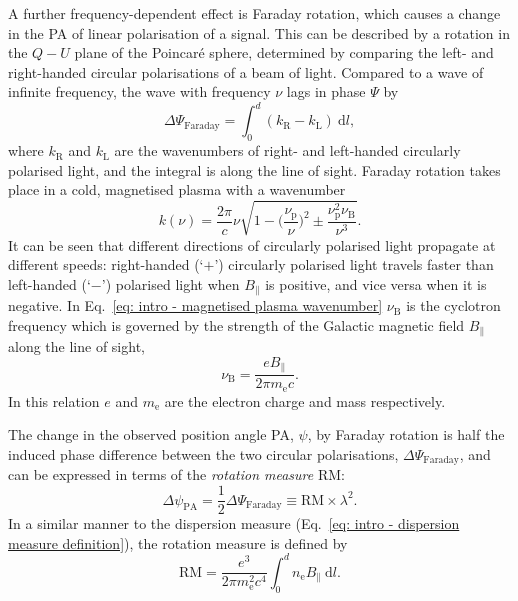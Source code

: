 A further frequency-dependent effect is Faraday rotation, which causes a change in the PA of linear polarisation of a signal. This can be described by a rotation in the $Q-U$ plane of the Poincar\'e sphere, determined by comparing the left- and right-handed circular polarisations of a beam of light. Compared to a wave of infinite frequency, the wave with frequency $\nu$ lags in phase $\Psi$ by
\begin{equation}
    \label{eq: intro - faraday rotation angle}
	\Delta\Psi_\mathrm{Faraday} = \int^d_0 (k_\mathrm{R}-k_\mathrm{L})\ \mathrm{d}l,
\end{equation}
where $k_\mathrm{R}$ and $k_\mathrm{L}$ are the wavenumbers of right- and left-handed circularly polarised light, and the integral is along the line of sight. Faraday rotation takes place in a cold, magnetised plasma with a wavenumber
\begin{equation}
    \label{eq: intro - magnetised plasma wavenumber}
    k(\nu) = \frac{2\pi}{c}\nu \sqrt{1-\bigg(\frac{\nu_\mathrm{p}}{\nu}\bigg)^2 \pm \frac{\nu_\mathrm{p}^2\nu_\mathrm{B}}{\nu^3} }.
\end{equation}
It can be seen that different directions of circularly polarised light propagate at different speeds: right-handed (`$+$') circularly polarised light travels faster than left-handed (`$-$') polarised light when $B_\parallel$ is positive, and vice versa when it is negative.
In Eq.~\eqref{eq: intro - magnetised plasma wavenumber} $\nu_\mathrm{B}$ is the cyclotron frequency which is governed by the strength of the Galactic magnetic field $B_\parallel$ along the line of sight,
\begin{equation}
    \label{eq: intro - cyclotron frequency}
	\nu_\mathrm{B} = \frac{eB_\parallel}{2\pi m_\mathrm{e}c}.
\end{equation}
In this relation $e$ and $m_\mathrm{e}$ are the electron charge and mass respectively. 

The change in the observed position angle PA, $\psi$, by Faraday rotation is half the induced phase difference between the two circular polarisations, $\Delta\Psi_\mathrm{Faraday}$, and can be expressed in terms of the \textit{rotation measure} RM:
\begin{equation}
    \label{eq: intro - PA rotation angle}
	\Delta\psi_\mathrm{PA} = \frac{1}{2} \Delta\Psi_\mathrm{Faraday} \equiv \mathrm{RM} \times \lambda^2.
\end{equation}
In a similar manner to the dispersion measure (Eq.~\eqref{eq: intro - dispersion measure definition}), the rotation measure is defined by
\begin{equation}
    \label{eq: intro - rotation measure definition}
	\mathrm{RM} = \frac{e^3}{2\pi m_\mathrm{e}^2 c^4} \int^d_0 n_\mathrm{e}B_\parallel\ \mathrm{d}l.
\end{equation}

